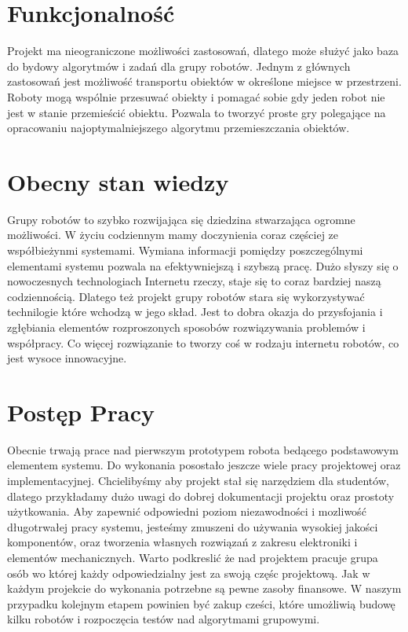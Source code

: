\documentclass[a4paper, 12pt]{article}
\begin{document}
\section{Funkcjonalność}
Projekt ma nieograniczone możliwości zastosowań, dlatego może służyć jako baza do bydowy algorytmów i zadań dla grupy robotów. Jednym z głównych zastosowań jest możliwość transportu obiektów w określone miejsce w przestrzeni. Roboty mogą wspólnie przesuwać obiekty i pomagać sobie gdy jeden robot nie jest w stanie przemieścić obiektu. Pozwala to tworzyć proste gry polegające na opracowaniu najoptymalniejszego algorytmu przemieszczania obiektów. 

\section{Obecny stan wiedzy}
Grupy robotów to szybko rozwijająca się dziedzina stwarzająca ogromne możliwości. W życiu codziennym mamy doczynienia coraz częściej ze współbieżynmi systemami. Wymiana informacji pomiędzy poszczególnymi elementami systemu pozwala na efektywniejszą i szybszą pracę. Dużo słyszy się o nowoczesnych technologiach Internetu rzeczy, staje się to coraz bardziej naszą codziennością. Dlatego też projekt grupy robotów stara się wykorzystywać technilogie które wchodzą w jego skład. Jest to dobra okazja do przysfojania i zgłębiania elementów rozproszonych sposobów rozwiązywania problemów i współpracy. Co więcej rozwiązanie to tworzy coś w rodzaju internetu robotów, co jest wysoce innowacyjne. 

\section{Postęp Pracy}
Obecnie trwają prace nad pierwszym prototypem robota bedącego podstawowym elementem systemu. Do wykonania posostało jeszcze wiele pracy projektowej oraz implementacyjnej. Chcielibyśmy aby projekt stał się narzędziem dla studentów, dlatego przykładamy dużo uwagi do dobrej dokumentacji projektu oraz prostoty użytkowania. Aby zapewnić odpowiedni poziom niezawodności i mozliwość długotrwałej pracy systemu, jesteśmy zmuszeni do używania wysokiej jakości komponentów, oraz tworzenia własnych rozwiązań z zakresu elektroniki i elementów mechanicznych. Warto podkreslić że nad projektem pracuje grupa osób wo której każdy odpowiedzialny jest za swoją częśc projektową. Jak w każdym projekcie do wykonania potrzebne są pewne zasoby finansowe. W naszym przypadku kolejnym etapem powinien być zakup cześci, które umożliwią budowę kilku robotów i rozpoczęcia testów nad algorytmami grupowymi. 
\end{document}
